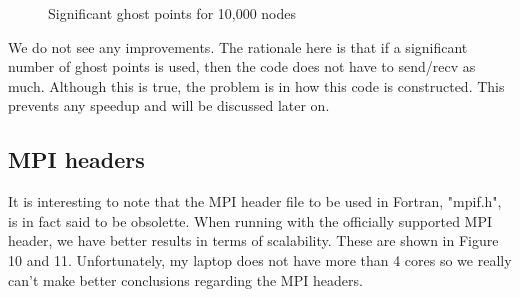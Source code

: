 \documentclass[12pt]{article}
\begin{document}
    \begin{figure}[H]
        \centering
        \qquad
        \caption{Significant ghost points for 10,000 nodes} 
    \end{figure}
    \noindent
    We do not see any improvements. The rationale here is that if a significant number of ghost points is used, then the code does not have to send/recv as much.  Although this is true, the problem is in how this code is constructed.  This prevents any speedup and will be discussed later on.  
    
    \subsection{MPI headers}
    It is interesting to note that the MPI header file to be used in Fortran, "mpif.h", is in fact said to be obsolette.  When running with the officially supported MPI header, we have better results in terms of scalability.  These are shown in Figure 10 and 11. Unfortunately, my laptop does not have more than 4 cores so we really can't make better conclusions regarding the MPI headers.
\end{document}
